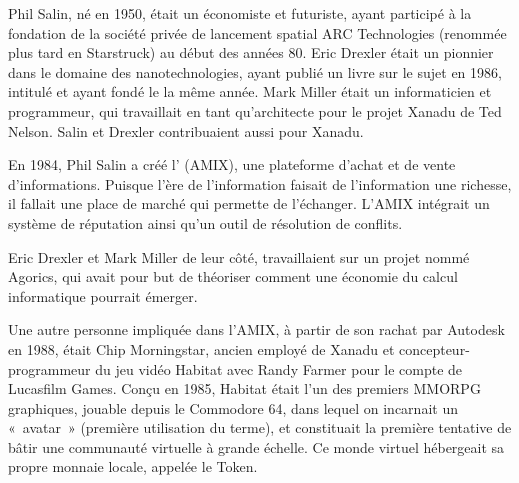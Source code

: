 Phil Salin, né en 1950, était un économiste et futuriste, ayant participé à la fondation de la société privée de lancement spatial ARC Technologies (renommée plus tard en Starstruck) au début des années 80. Eric Drexler était un pionnier dans le domaine des nanotechnologies, ayant publié un livre sur le sujet en 1986, intitulé  et ayant fondé le  la même année. Mark Miller était un informaticien et programmeur, qui travaillait en tant qu'architecte pour le projet Xanadu de Ted Nelson. Salin et Drexler contribuaient aussi pour Xanadu. %

En 1984, Phil Salin a créé l' (AMIX), une plateforme d'achat et de vente d'informations. Puisque l'ère de l'information faisait de l'information une richesse, il fallait une place de marché qui permette de l'échanger. L'AMIX intégrait un système de réputation ainsi qu'un outil de résolution de conflits.


Eric Drexler et Mark Miller de leur côté, travaillaient sur un projet nommé Agorics, qui avait pour but de théoriser comment une économie du calcul informatique pourrait émerger.

Une autre personne impliquée dans l'AMIX, à partir de son rachat par Autodesk en 1988, était Chip Morningstar, ancien employé de Xanadu et concepteur-programmeur du jeu vidéo Habitat avec Randy Farmer pour le compte de Lucasfilm Games. Conçu en 1985, Habitat était l'un des premiers MMORPG graphiques, jouable depuis le Commodore 64, dans lequel on incarnait un «~avatar~» (première utilisation du terme), et constituait la première tentative de bâtir une communauté virtuelle à grande échelle. Ce monde virtuel hébergeait sa propre monnaie locale, appelée le Token.

